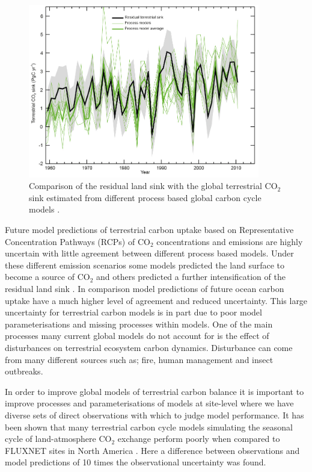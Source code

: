 \documentclass[11pt]{article}
\begin{document}
\begin{figure}[ht]
    \centering
    \includegraphics[width=0.9\textwidth]{ipcc_fig6_16.jpg}
    \caption{Comparison of the residual land sink with the global terrestrial CO\(_{2}\) sink estimated from different process based global carbon cycle models \citep{ciais2014carbon}.}
    \label{fig:ipcc_fig6.16}
\end{figure}

Future model predictions of terrestrial carbon uptake based on Representative Concentration Pathways (RCPs) \citep{moss2010next} of CO\(_{2}\) concentrations and emissions are highly uncertain with little agreement between different process based models. Under these different emission scenarios some models predicted the land surface to become a source of CO\(_{2}\) and others predicted a further intensification of the residual land sink \citep{jones2013twenty}. In comparison model predictions of future ocean carbon uptake have a much higher level of agreement and reduced uncertainty. This large uncertainty for terrestrial carbon models is in part due to poor model parameterisations and missing processes within models. One of the main processes many current global models do not account for is the effect of disturbances on terrestrial ecosystem carbon dynamics. Disturbance can come from many different sources such as; fire, human management and insect outbreaks.

In order to improve global models of terrestrial carbon balance it is important to improve processes and parameterisations of models at site-level where we have diverse sets of direct observations with which to judge model performance. It has been shown that many terrestrial carbon cycle models simulating the seasonal cycle of land-atmosphere CO\(_{2}\) exchange perform poorly when compared to FLUXNET sites in North America \citep{schwalm2010model}. Here a difference between observations and model predictions of 10 times the observational uncertainty was found.        
\end{document}
